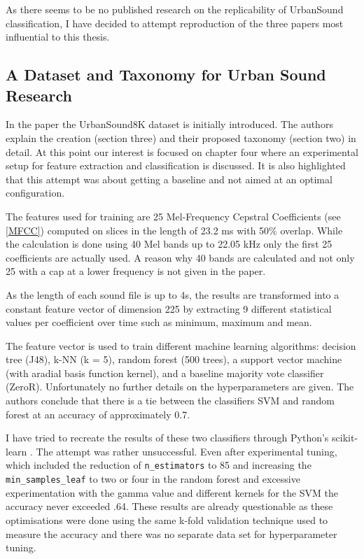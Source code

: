 As there seems to be no published research on the replicability of UrbanSound classification, I have decided to attempt reproduction of the three papers most influential to this thesis.





\newpage

\subsection{A Dataset and Taxonomy for Urban Sound Research}

In the paper \cite{Salamon:UrbanSound:ACMMM:14} the UrbanSound8K dataset is initially introduced. The authors explain the creation (section three) and their proposed taxonomy (section two) in detail. At this point  our interest is focused on chapter four where an experimental setup for feature extraction and classification is discussed. It is also highlighted that this attempt was about getting a baseline and not aimed at an optimal configuration.

The features used for training are 25 Mel-Frequency Cepstral Coefficients (see \ref{MFCC}) computed on slices in the length of 23.2 ms with 50\% overlap. While the calculation is done using 40 Mel bands up to 22.05 kHz only the first 25 coefficients are actually used. A reason why 40 bands are calculated and not only 25 with a cap at a lower frequency is not given in the paper.

 As the length of each sound file is up to 4s, the results are transformed into a constant feature vector of dimension 225 by extracting 9 different statistical values per coefficient over time such as minimum, maximum and mean.

The feature vector is used to train different machine learning algorithms: decision tree (J48), k-NN (k = 5), random forest (500 trees), a support vector machine (with aradial basis function kernel), and a baseline majority vote classifier (ZeroR). Unfortunately no further details on the hyperparameters are given. The authors conclude that there is a tie between the classifiers SVM and random forest at an accuracy of approximately 0.7.

I have tried to recreate the results of these two classifiers through Python's scikit-learn \cite{scikit-learn}. The attempt was rather unsuccessful. Even after experimental tuning, which included the reduction of \texttt{n_estimators} to 85 and increasing the \texttt{min_samples_leaf} to two or four in the random forest and excessive experimentation with the gamma value and different kernels for the SVM the accuracy never exceeded .64. These results are already questionable as these optimisations were done using the same k-fold validation technique used to measure the accuracy and there was no separate data set for hyperparameter tuning.
 
